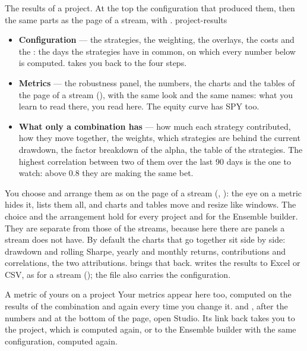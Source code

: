   {The results of a project. At the top the configuration that produced
   them, then the same parts as the page of a stream, with
   .}
  {project-results}

\begin{itemize}
  \item \textbf{Configuration} --- the strategies, the weighting, the
    overlays, the costs and the : the days the strategies have
    in common, on which every number below is computed.
     takes you back to the four steps.
  \item \textbf{Metrics} --- the robustness panel, the numbers, the charts
    and the tables of the page of a stream (), with
    the same look and the same names: what you learn to read there, you read
    here. The equity curve has SPY too.
  \item \textbf{What only a combination has} --- how much each strategy
    contributed, how they move together, the weights, which strategies are
    behind the current drawdown, the factor breakdown of the alpha, the table
    of the strategies. The highest correlation between two of them over the
    last 90 days is the one to watch: above 0.8 they are making the same bet.
\end{itemize}

\noindent
You choose and arrange them as on the page of a stream
(, ): the eye on a metric
hides it,  lists them all, and charts and tables
move and resize like windows. The choice and the arrangement hold for every
project and for the Ensemble builder. They are separate from those of the
streams, because here there are panels a stream does not have. By default
the charts that go together sit side by side: drawdown and rolling Sharpe,
yearly and monthly returns, contributions and correlations, the two
attributions.  brings that back.
 writes the results to Excel or CSV, as for a stream
(); the file also carries the configuration.

\begin{pratica}{A metric of yours on a project}
Your metrics appear here too, computed on the results of the combination
and again every time you change it.  and
, after the numbers and at the bottom of the
page, open Studio. Its link back takes you to the project, which is computed
again, or to the Ensemble builder with the same configuration, computed
again.
\end{pratica}

